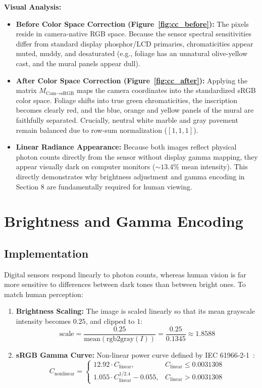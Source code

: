 \documentclass[a4paper]{article}
\begin{document}
\textbf{Visual Analysis:}
\begin{itemize}
    \item \textbf{Before Color Space Correction (Figure~\ref{fig:cc_before}):} The pixels reside in camera-native RGB space. Because the sensor spectral sensitivities differ from standard display phosphor/LCD primaries, chromaticities appear muted, muddy, and desaturated (e.g., foliage has an unnatural olive-yellow cast, and the mural panels appear dull).
    \item \textbf{After Color Space Correction (Figure~\ref{fig:cc_after}):} Applying the matrix $M_{\text{Cam}\to\text{sRGB}}$ maps the camera coordinates into the standardized sRGB color space. Foliage shifts into true green chromaticities, the inscription becomes clearly red, and the blue, orange and yellow panels of the mural are faithfully separated. Crucially, neutral white marble and gray pavement remain balanced due to row-sum normalization ($[1, 1, 1]$).
    \item \textbf{Linear Radiance Appearance:} Because both images reflect physical photon counts directly from the sensor without display gamma mapping, they appear visually dark on computer monitors (${\sim}13.4\%$ mean intensity). This directly demonstrates why brightness adjustment and gamma encoding in Section 8 are fundamentally required for human viewing.
\end{itemize}

\section{Brightness and Gamma Encoding}

\subsection{Implementation}
Digital sensors respond linearly to photon counts, whereas human vision is far more sensitive to differences between dark tones than between bright ones. To match human perception:
\begin{enumerate}
    \item \textbf{Brightness Scaling:} The image is scaled linearly so that its mean grayscale intensity becomes $0.25$, and clipped to $1$:
    \begin{equation}
        \text{scale} = \frac{0.25}{\text{mean}(\text{rgb2gray}(I))} = \frac{0.25}{0.1345} \approx 1.8588
    \end{equation}
    \item \textbf{sRGB Gamma Curve:} Non-linear power curve defined by IEC 61966-2-1~\cite{iec1999srgb}:
    \begin{equation}
        C_{\text{nonlinear}} = \begin{cases}
            12.92 \cdot C_{\text{linear}}, & C_{\text{linear}} \le 0.0031308 \\
            1.055 \cdot C_{\text{linear}}^{1/2.4} - 0.055, & C_{\text{linear}} > 0.0031308
        \end{cases}
    \end{equation}
\end{enumerate}
\end{document}
